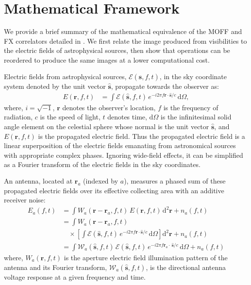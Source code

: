 \documentclass[a4paper,fleqn,usenatbib]{mnras}
\newcommand{\dif}{\mathrm{d}}
\begin{document}
\section{Mathematical Framework}\label{sec:math}

We provide a brief summary of the mathematical equivalence of the MOFF and FX correlators detailed in \citet{mor11}. We first relate the image produced from visibilities to the electric fields of astrophysical sources, then show that operations can be reordered to produce the same images at a lower computational cost.

Electric fields from astrophysical sources, $\mathcal{E}(\hat{\mathbf{s}}, f, t)$, in the sky coordinate system denoted by the unit vector $\hat{\mathbf{s}}$, propagate towards the observer as:
\begin{align}
  E(\mathbf{r}, f, t) &= \int \mathcal{E}(\hat{\mathbf{s}},f,t)\,e^{-i 2\pi f\mathbf{r}\cdot\hat{\mathbf{s}}/c}\,\dif\Omega,
\end{align}
where, $i=\sqrt{-1}$, $\mathbf{r}$ denotes the observer's location, $f$ is the frequency of radiation, $c$ is the speed of light, $t$ denotes time, $\dif\Omega$ is the infinitesimal solid angle element on the celestial sphere whose normal is the unit vector $\hat{\mathbf{s}}$, and $E(\mathbf{r}, f, t)$ is the propagated electric field. Thus the propagated electric field is a linear superposition of the electric fields emanating from astronomical sources with appropriate complex phases. Ignoring wide-field effects, it can be simplified as a Fourier transform of the electric fields in the sky coordinates. 

An antenna, located at $\mathbf{r}_a$ (indexed by $a$), measures a phased sum of these propagated electric fields over its effective collecting area with an additive receiver noise:
\begin{align}\label{eqn:measured-E-field}
  E_a(f,t) &= \int W_a(\mathbf{r}-\mathbf{r}_a,f,t)\,E(\mathbf{r},f,t)\,\dif^2\mathbf{r} + n_a(f,t) \\
           &= \int W_a(\mathbf{r}-\mathbf{r}_a,f,t) \nonumber \\
           &\quad \times \left[ \int \mathcal{E}(\hat{\mathbf{s}},f,t)\,e^{-i 2\pi f\mathbf{r}\cdot\hat{\mathbf{s}}/c}\,\dif\Omega \right] \dif^2\mathbf{r} + n_a(f,t) \\
           &= \int \mathcal{W}_a(\hat{\mathbf{s}},f,t)\,\mathcal{E}(\hat{\mathbf{s}},f,t)\,e^{-i 2\pi f\mathbf{r}_a\!\cdot\,\hat{\mathbf{s}}/c}\,\dif\Omega + n_a(f,t)
\end{align}
where, $W_a(\mathbf{r},f,t)$ is the aperture electric field illumination pattern of the antenna and its Fourier transform, $\mathcal{W}_a(\hat{\mathbf{s}},f,t)$, is the directional antenna voltage response at a given frequency and time.
\end{document}
